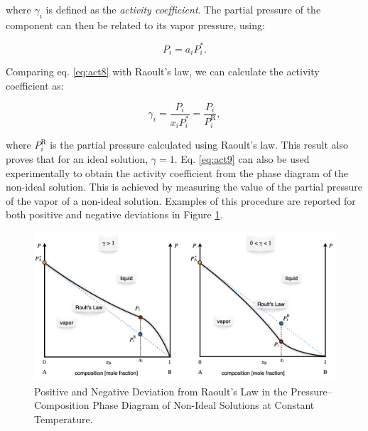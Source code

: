 \documentclass[
  9pt,
]{extbook}
\theoremstyle{definition}
\theoremstyle{definition}
\theoremstyle{definition}
\theoremstyle{remark}
\begin{document}
where \(\gamma_i\) is defined as the \emph{activity coefficient}. The partial pressure of the component can then be related to its vapor pressure, using:

\begin{equation}
P_i = a_i P_i^*.
\label{eq:act8}
\end{equation}

Comparing eq. \eqref{eq:act8} with Raoult's law, we can calculate the activity coefficient as:

\begin{equation}
\gamma_i = \frac{P_i}{x_i P_i^*} = \frac{P_i}{P_i^{\text{R}}},
\label{eq:act9}
\end{equation}

where \(P_i^{\text{R}}\) is the partial pressure calculated using Raoult's law. This result also proves that for an ideal solution, \(\gamma=1\). Eq. \eqref{eq:act9} can also be used experimentally to obtain the activity coefficient from the phase diagram of the non-ideal solution. This is achieved by measuring the value of the partial pressure of the vapor of a non-ideal solution. Examples of this procedure are reported for both positive and negative deviations in Figure \ref{fig:FigSol1}.

\begin{figure}

{\centering \includegraphics[width=0.8\linewidth]{./img/OEP_Figures.033} 

}

\caption{Positive and Negative Deviation from Raoult's Law in the Pressure–Composition Phase Diagram of Non-Ideal Solutions at Constant Temperature.}\label{fig:FigSol1}
\end{figure}
\end{document}
